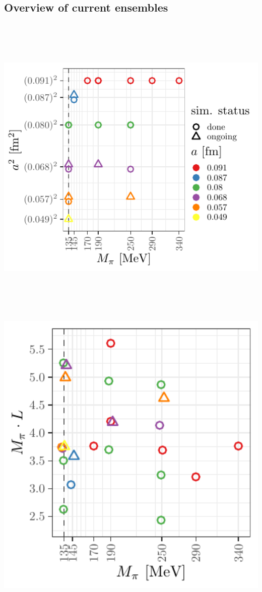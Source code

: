 \documentclass[a0,portrait]{a0poster}
\begin{document}
\begin{multicols}{2}
    \subsection*{Overview of current ensembles}
    \begin{center}
      \includegraphics[height=15cm]{ensembles_asquared_mpi}\hspace{1cm}
      \includegraphics[height=15cm]{ensembles_L_vs_mpi}

\end{center}
\end{multicols}
\end{document}

